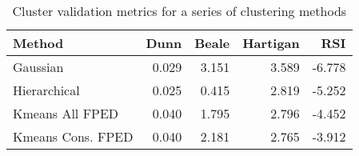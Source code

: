 \begin{table}[h]
\caption{Cluster validation metrics for a series of clustering methods}
\label{tab:cluster_metrics}
\begin{tabular}{lrrrr}
\toprule
Method & Dunn & Beale & Hartigan & RSI \\
\midrule
Gaussian & 0.029 & 3.151 & 3.589 & -6.778 \\
Hierarchical & 0.025 & 0.415 & 2.819 & -5.252 \\
Kmeans All FPED & 0.040 & 1.795 & 2.796 & -4.452 \\
Kmeans Cons. FPED & 0.040 & 2.181 & 2.765 & -3.912 \\
\bottomrule
\end{tabular}
\end{table}
